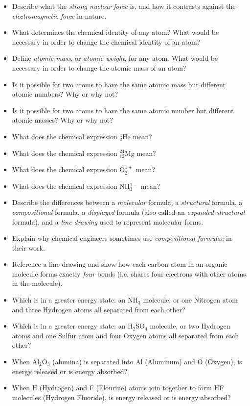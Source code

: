 \begin{itemize}
\item{} Describe what the {\it strong nuclear force} is, and how it contrasts against the {\it electromagnetic force} in nature.
\item{} What determines the chemical identity of any atom?  What would be necessary in order to change the chemical identity of an atom?
\item{} Define {\it atomic mass}, or {\it atomic weight}, for any atom.  What would be necessary in order to change the atomic mass of an atom?  
\item{} Is it possible for two atoms to have the same atomic mass but different atomic numbers?  Why or why not?
\item{} Is it possible for two atoms to have the same atomic number but different atomic masses?  Why or why not?
\item{} What does the chemical expression $_{2}^{4}$He mean?
\item{} What does the chemical expression $_{12}^{24}$Mg mean?
\item{} What does the chemical expression O$_{2}^{1+}$ mean?
\item{} What does the chemical expression NH$_{3}^{1-}$ mean?
\item{} Describe the differences between a {\it molecular} formula, a {\it structural} formula, a {\it compositional} formula, a {\it displayed} formula (also called an {\it expanded structural} formula), and a {\it line drawing} used to represent molecular forms.
\item{} Explain why chemical engineers sometimes use {\it compositional formulae} in their work. 
\item{} Reference a line drawing and show how each carbon atom in an organic molecule forms exactly {\it four} bonds (i.e. shares four electrons with other atoms in the molecule).
\item{} Which is in a greater energy state: an NH$_{3}$ molecule, or one Nitrogen atom and three Hydrogen atoms all separated from each other?
\item{} Which is in a greater energy state: an H$_{2}$SO$_{4}$ molecule, or two Hydrogen atoms and one Sulfur atom and four Oxygen atoms all separated from each other?
\item{} When Al$_{2}$O$_{3}$ (alumina) is separated into Al (Aluminum) and O (Oxygen), is energy released or is energy absorbed?
\item{} When H (Hydrogen) and F (Flourine) atoms join together to form HF molecules (Hydrogen Fluoride), is energy released or is energy absorbed?
\end{itemize}




